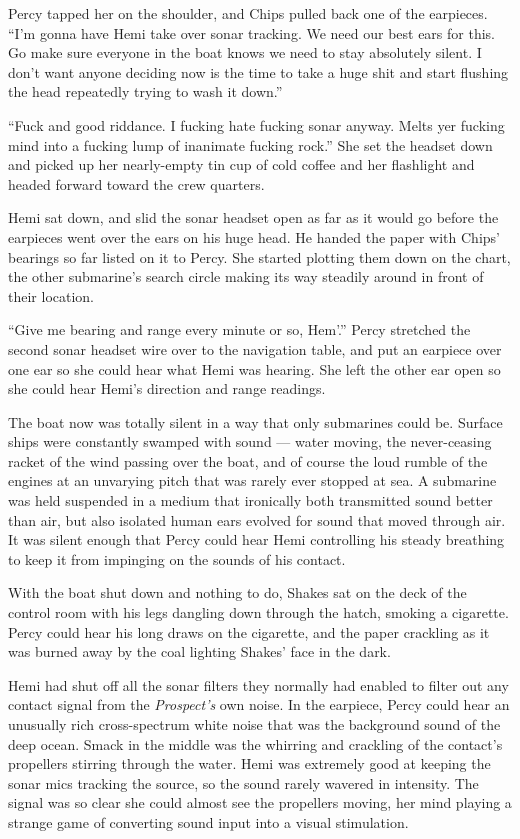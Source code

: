 \documentclass[
]{scrbook}
\begin{document}
Percy tapped her on the shoulder, and Chips pulled back one of the
earpieces. ``I'm gonna have Hemi take over sonar tracking. We need our
best ears for this. Go make sure everyone in the boat knows we need to
stay absolutely silent. I don't want anyone deciding now is the time to
take a huge shit and start flushing the head repeatedly trying to wash
it down.''

``Fuck and good riddance. I fucking hate fucking sonar anyway. Melts yer
fucking mind into a fucking lump of inanimate fucking rock.'' She set
the headset down and picked up her nearly-empty tin cup of cold coffee
and her flashlight and headed forward toward the crew quarters.

Hemi sat down, and slid the sonar headset open as far as it would go
before the earpieces went over the ears on his huge head. He handed the
paper with Chips' bearings so far listed on it to Percy. She started
plotting them down on the chart, the other submarine's search circle
making its way steadily around in front of their location.

``Give me bearing and range every minute or so, Hem'.'' Percy stretched
the second sonar headset wire over to the navigation table, and put an
earpiece over one ear so she could hear what Hemi was hearing. She left
the other ear open so she could hear Hemi's direction and range
readings.

The boat now was totally silent in a way that only submarines could be.
Surface ships were constantly swamped with sound --- water moving, the
never-ceasing racket of the wind passing over the boat, and of course
the loud rumble of the engines at an unvarying pitch that was rarely
ever stopped at sea. A submarine was held suspended in a medium that
ironically both transmitted sound better than air, but also isolated
human ears evolved for sound that moved through air. It was silent
enough that Percy could hear Hemi controlling his steady breathing to
keep it from impinging on the sounds of his contact.

With the boat shut down and nothing to do, Shakes sat on the deck of the
control room with his legs dangling down through the hatch, smoking a
cigarette. Percy could hear his long draws on the cigarette, and the
paper crackling as it was burned away by the coal lighting Shakes' face
in the dark.

Hemi had shut off all the sonar filters they normally had enabled to
filter out any contact signal from the \emph{Prospect's} own noise. In
the earpiece, Percy could hear an unusually rich cross-spectrum white
noise that was the background sound of the deep ocean. Smack in the
middle was the whirring and crackling of the contact's propellers
stirring through the water. Hemi was extremely good at keeping the sonar
mics tracking the source, so the sound rarely wavered in intensity. The
signal was so clear she could almost see the propellers moving, her mind
playing a strange game of converting sound input into a visual
stimulation.
\end{document}

